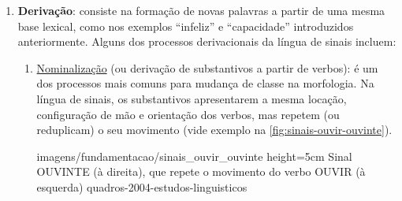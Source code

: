 

\begin{enumerate}
    \item \textbf{Derivação}: consiste na formação de novas palavras a partir de uma mesma base lexical, como nos exemplos ``infeliz'' e ``capacidade'' introduzidos anteriormente. Alguns dos processos derivacionais da língua de sinais incluem:
    

    \begin{enumerate}
        \item \underline{Nominalização} (ou derivação de substantivos a partir de verbos): é um dos processos mais comuns para mudança de classe na morfologia. Na língua de sinais, os substantivos apresentarem a mesma locação, configuração de mão e orientação dos verbos, mas repetem (ou reduplicam) o seu movimento (vide exemplo na \autoref{fig:sinais-ouvir-ouvinte}).
        
            {imagens/fundamentacao/sinais_ouvir_ouvinte} %
            {height=5cm} %
            {Sinal OUVINTE (à direita), que repete o movimento do verbo OUVIR (à esquerda)} %
            {quadros-2004-estudos-linguisticos} %
        





\end{enumerate}
\end{enumerate}
